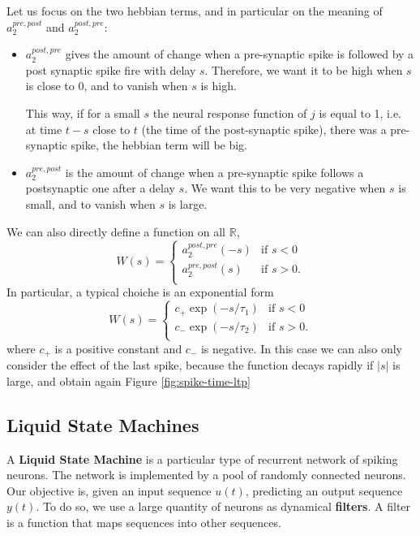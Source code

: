 \documentclass[oneside]{book}
\newcommand{\R}{\mathbb{R}}
\theoremstyle{definition}
\theoremstyle{plain}
\begin{document}
Let us focus on the two hebbian terms, and in particular on the meaning of $a_2^{pre,post}$ and $a_2^{post, pre}$:  
\begin{itemize}
    \item $a_2^{post,pre}$ gives the amount of change when a pre-synaptic spike is followed by a post synaptic spike fire with delay $s$. Therefore, we want it to be high when $s$ is close to 0, and to vanish when $s$ is high. 

This way, if for a small $s$ the neural response function of $j$ is equal to 1, i.e. at time $t-s$ close to $t$ (the time of the post-synaptic spike), there was a pre-synaptic spike,  the hebbian term will be big.
    \item $a_2^{pre, post}$ is the amount of change when a pre-synaptic spike follows a postsynaptic one after a delay $s$.  We want this to be very negative when $s$ is small, and to vanish when $s$ is large. 
\end{itemize}

We can also directly define a function on all $\R$, 
\[
    W(s) =\begin{cases}
        a_2^{post, pre}(-s) & \text{if  }s<0\\
        a_2^{pre, post}(s)  & \text{if }s>0.\\ 
    \end{cases}
\]
In particular, a typical choiche is an exponential form
\[
W(s) =\begin{cases}
        c_+ \exp(-s/\tau_1) & \text{if  }s<0\\
        c_- \exp(- s/\tau_2)  & \text{if }s>0.\\ 
    \end{cases}
\]
where $c_+$ is a positive constant and $c_-$ is negative. In this case we can also only consider the effect of the last spike, because the function decays rapidly if $|s|$ is  large, and obtain again Figure \ref{fig:spike-time-ltp}
\subsection{Liquid State Machines}
A \textbf{Liquid State Machine} is a particular type of recurrent network of spiking neurons. The network is implemented by a pool of randomly connected neurons. Our objective is, given an input sequence $u(t)$, predicting an output sequence $y(t)$.
To do so, we use a large quantity of neurons as dynamical \textbf{filters}.
A filter is a function that maps sequences into other sequences.
\end{document}
